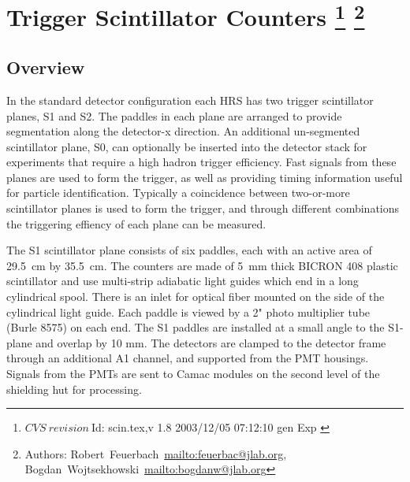 \chapter[Trigger Scintillator Counters]{Trigger Scintillator Counters
  \footnote{
    $CVS~revision~ $Id: scin.tex,v 1.8 2003/12/05 07:12:10 gen Exp $ $
  }
  \footnote{Authors: Robert~Feuerbach~\url{mailto:feuerbac@jlab.org},
    Bogdan~Wojtsekhowski~\url{mailto:bogdanw@jlab.org}}
}
\section{Overview}

\newcommand{\unit}[1]{\,\mbox{\ensuremath{\mathrm{#1}}}}

In the standard detector configuration each HRS has two trigger
scintillator planes, S1 and S2. The paddles in each plane are arranged to
provide segmentation along the detector-x direction. An additional
un-segmented scintillator plane, S0, can optionally be inserted into the
detector stack for experiments that require a high hadron trigger
efficiency. Fast signals from
these planes are used to form the trigger, as well as providing timing
information useful for particle identification.  Typically a coincidence between
two-or-more scintillator planes is used to form the trigger, and
through different combinations the triggering effiency of each plane can
be measured.

The S1 scintillator plane consists of six paddles, each with an active area
of 29.5~cm by 35.5~cm. The counters are made of 5~mm thick BICRON 408
plastic scintillator and use multi-strip adiabatic light guides which end
in a long cylindrical spool. There is an inlet for optical fiber mounted on
the side of the cylindrical light guide. Each paddle is viewed by a 2"
photo multiplier tube (Burle 8575) on each end.  The S1 paddles are
installed at a small angle to the S1-plane and overlap by 10 mm.  The
detectors are clamped to the detector frame through an additional A1
channel, and supported from the PMT housings. 
Signals from the PMTs are sent to Camac
modules on the second level of the shielding hut for processing.

